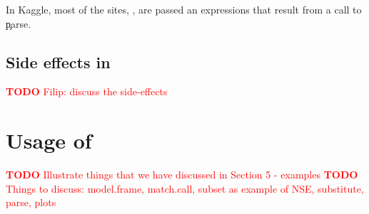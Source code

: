\documentclass[screen,acmsmall]{acmart}
\newcommand{\mypara}[1]{\medskip\noindent\emph{#1}\xspace}
\newcommand{\authorcomment}[3]{\xspace\textcolor{#1}{{\bf #2} #3}\xspace}
\newcommand{\todo}[1]{\authorcomment{red}{TODO}{#1}}
\begin{document}
In Kaggle, most of the sites, \ie \kaggleParseExprsSitePercent, are passed  an expressions that result from a call to \c{parse}.

\subsection{Side effects in \eval}

\todo{Filip: discuss the side-effects}

\section{Usage of \eval}

\todo{Illustrate things that we have discussed in Section 5 - examples}
\todo{Things to discuss: model.frame, match.call, subset as example of NSE, substitute, parse, plots}











\end{document}
